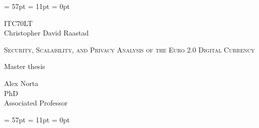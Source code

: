 \documentclass[12pt]{article} %
\begin{document}
\thispagestyle{fancy} %
\renewcommand{\headrulewidth}{0pt} %
\renewcommand{\footrulewidth}{0pt} %
\headheight = 57pt %
\footskip = 11pt %
\headsep = 0pt %

\vspace*{7 cm} %

\begin{center} %
ITC70LT\\[0cm]
Christopher David Raastad\\
\begin{LARGE}
\textsc{Security, Scalability, and Privacy Analysis of the Euro 2.0 Digital Currency\\}
\end{LARGE}
Master thesis\\[2cm]
\end{center}

\begin{flushright} %
Alex Norta\\[0cm]
PhD\\[0cm]
Associated Professor\\[0cm]
\end{flushright}

\pagebreak %

\thispagestyle{fancy} %
\renewcommand{\headrulewidth}{0pt} %
\renewcommand{\footrulewidth}{0pt} %
\headheight = 57pt %
\footskip = 11pt %
\headsep = 0pt %
\end{document}
